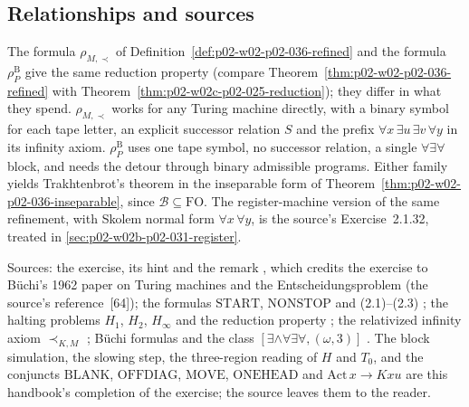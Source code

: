\subsection{Relationships and sources}
\label{sec:p02-w02c-p02-025-relationships}

The formula \(\rho_{M,\prec}\) of Definition~\ref{def:p02-w02-p02-036-refined}
and the formula \(\rho^{\mathrm B}_P\) give the same reduction property
(compare Theorem~\ref{thm:p02-w02-p02-036-refined} with
Theorem~\ref{thm:p02-w02c-p02-025-reduction}); they differ in what they spend.
\(\rho_{M,\prec}\) works for any Turing machine directly, with a binary symbol
for each tape letter, an explicit successor relation \(S\) and the prefix
\(\forall x\,\exists u\,\exists v\,\forall y\) in its infinity axiom.
\(\rho^{\mathrm B}_P\) uses one tape symbol, no successor relation, a single
\(\forall\exists\forall\) block, and needs the detour through binary admissible
programs.  Either family yields Trakhtenbrot's theorem in the inseparable form
of Theorem~\ref{thm:p02-w02-p02-036-inseparable}, since
\(\mathcal B\subseteq\mathrm{FO}\).  The register-machine version of the same
refinement, with Skolem normal form \(\forall x\,\forall y\), is the source's
Exercise~2.1.32, treated in \cref{sec:p02-w02b-p02-031-register}.

Sources: the exercise, its hint and the remark
\cite[Sect.~2.1.2, Exercise~2.1.31 and Remark, pp.~35--36]{BorgerGradelGurevich1997},
which credits the exercise to B\"uchi's 1962 paper on Turing machines and the
Entscheidungsproblem (the source's reference~[64]); the formulas
\(\mathrm{START}\), \(\mathrm{NONSTOP}\) and (2.1)--(2.3)
\cite[Sect.~2.1.1, pp.~20--22]{BorgerGradelGurevich1997}; the halting problems
\(H_1\), \(H_2\), \(H_\infty\) and the reduction property
\cite[Sect.~2.1.2, p.~34]{BorgerGradelGurevich1997}; the relativized infinity
axiom \(\prec_{K,M}\) \cite[Sect.~2.1.2, p.~35]{BorgerGradelGurevich1997};
B\"uchi formulas and the class \([\exists\land\forall\exists\forall,(\omega,3)]\)
\cite[Sect.~3.2, pp.~115--116]{BorgerGradelGurevich1997}.  The block
simulation, the slowing step, the three-region reading of \(H\) and \(T_0\), and
the conjuncts \(\mathrm{BLANK}\), \(\mathrm{OFFDIAG}\), \(\mathrm{MOVE}\),
\(\mathrm{ONEHEAD}\) and \(\mathrm{Act}\,x\to Kxu\) are this handbook's
completion of the exercise; the source leaves them to the reader.
